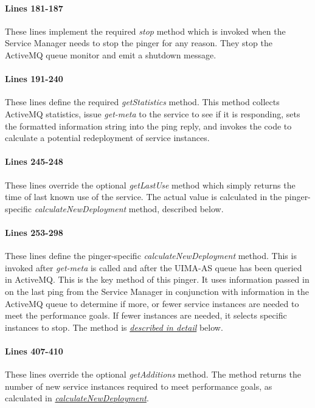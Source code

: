     \paragraph{Lines 181-187}
    These lines implement the required {\em stop} method which is invoked when
    the Service Manager needs to stop the pinger for any reason.  They stop the
    ActiveMQ queue monitor and emit a shutdown message.

    \paragraph{Lines 191-240}
    These lines define the required {\em getStatistics} method.  This 
    method collects ActiveMQ statistics, issue {\em get-meta} to the
    service to see if it is responding, sets the formatted information
    string into the ping reply, and invokes the code to calculate a
    potential redeployment of service instances.

    \paragraph{Lines 245-248}
    These lines override the optional {\em getLastUse} method which
    simply returns the time of last known use of the service.  The actual
    value is calculated in the pinger-specific {\em calculateNewDeployment}
    method, described below.

    \paragraph{Lines 253-298}
    These lines define the pinger-specific {\em calculateNewDeployment}
    method.  This is invoked after {\em get-meta} is called and after the
    UIMA-AS queue has been queried in ActiveMQ.  This is the key method of
    this pinger.  It uses information passed in on the last ping from the
    Service Manager in conjunction with information in the ActiveMQ queue
    to determine if more, or fewer service instances are needed to meet the
    performance goals.  If fewer instances are needed, it selects specific
    instances to stop.  The method is 
    \hyperref[subsec:services.calculate-new]{\em described in detail} below.

    \paragraph{Lines 407-410}
    These lines override the optional {\em getAdditions} method.  The method
    returns the number of new service instances required to meet performance
    goals, as calculated in
    \hyperref[subsec:services.calculate-new]{\em calculateNewDeployment}.

